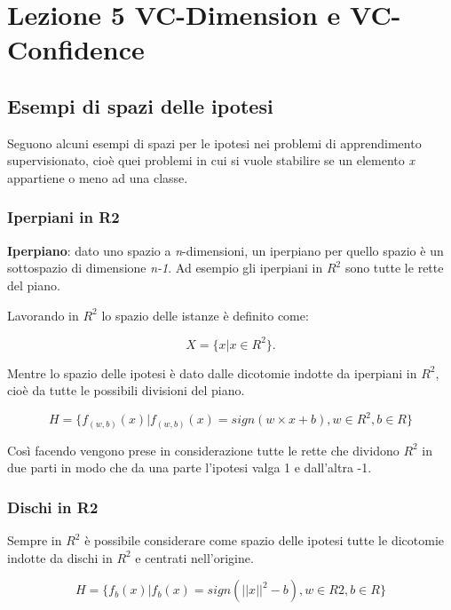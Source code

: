 \section{Lezione 5 VC-Dimension e VC-Confidence}\label{lezione-5-vc-dimension-e-vc-confidence}

\subsection{Esempi di spazi delle ipotesi}\label{esempi-di-spazi-delle-ipotesi}

Seguono alcuni esempi di spazi per le ipotesi nei problemi di
apprendimento supervisionato, cioè quei problemi in cui si vuole
stabilire se un elemento \emph{x} appartiene o meno ad una classe.

\subsubsection{Iperpiani in R2}\label{iperpiani-in-r2}

\textbf{Iperpiano}: dato uno spazio a \emph{n}-dimensioni, un iperpiano
per quello spazio è un sottospazio di dimensione \emph{n-1}. Ad esempio gli
iperpiani in $R^2$ sono tutte le rette del piano.

Lavorando in $R^2$ lo spazio delle istanze è definito come:

$$
X = \{x | x \in R^2\}.
$$

Mentre lo spazio delle ipotesi è dato dalle dicotomie indotte da iperpiani in $R^2$, cioè da tutte le possibili divisioni del piano.

$$
H = \{f_{(w,b)}(x) | f_{(w,b)}(x) = sign(w \times x + b), w \in R^2, b \in R\}
$$

Così facendo vengono prese in considerazione tutte le rette che dividono
$R^2$ in due parti in modo che da una parte l'ipotesi valga 1 e dall'altra
-1.

\subsubsection{Dischi in R2}\label{dischi-in-r2}

Sempre in $R^2$ è possibile considerare come spazio delle ipotesi tutte le
dicotomie indotte da dischi in $R^2$ e centrati nell'origine.

$$
H = \{f_b(x) | f_b(x) = sign(||x||^2 - b), w \in R2, b \in R\}
$$

